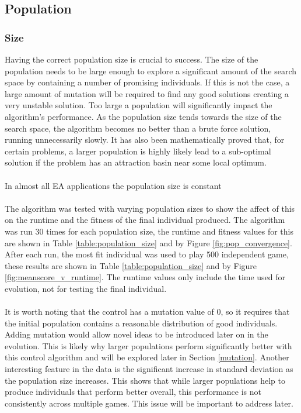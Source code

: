 \documentclass{article}
\begin{document}
\subsection{Population}
\subsubsection{Size}
\label{population_size}
Having the correct population size is crucial to success\cite{dynamic_population_size}. The size of the population needs to be large enough to explore a significant amount of the search space by containing a number of promising individuals. If this is not the case, a large amount of mutation will be required to find any good solutions creating a very unstable solution. Too large a population will significantly impact the algorithm's performance. As the population size tends towards the size of the search space, the algorithm becomes no better than a brute force solution, running unnecessarily slowly. It has also been mathematically proved that, for certain problems, a larger population is highly likely lead to a sub-optimal solution if the problem has an attraction basin near some local optimum\cite{unhelpful_large_populations}.
\\\\
In almost all EA applications the population size is constant\cite[p. 20]{textbook}
\\\\
The algorithm was tested with varying population sizes to show the affect of this on the runtime and the fitness of the final individual produced. The algorithm was run 30 times for each population size, the runtime and fitness values for this are shown in Table \ref{table:population_size} and by Figure \ref{fig:pop_convergence}. After each run, the most fit individual was used to play 500 independent game, these results are shown in Table \ref{table:population_size} and by Figure \ref{fig:meanscore_v_runtime}. The runtime values only include the time used for evolution, not for testing the final individual.
\\\\
It is worth noting that the control has a mutation value of 0, so it requires that the initial population contains a reasonable distribution of good individuals. Adding mutation would allow novel ideas to be introduced later on in the evolution. This is likely why larger populations perform significantly better with this control algorithm and will be explored later in Section \ref{mutation}. Another interesting feature in the data is the significant increase in standard deviation as the population size increases. This shows that while larger populations help to produce individuals that perform better overall, this performance is not consistently across multiple games. This issue will be important to address later.
\end{document}
